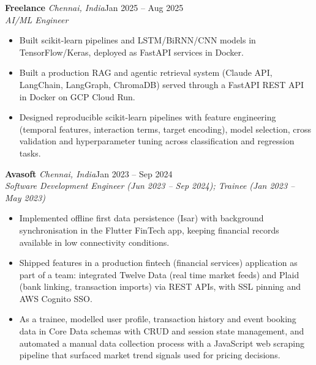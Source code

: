 \documentclass[a4paper,11pt]{article}
\newcommand{\role}[4]{%
  \textbf{#1}{\color{muted}\,\textperiodcentered\,\textit{#2}}\hfill{\color{muted}#3}\\
  \textit{#4}\par}
\newcommand{\gap}{\vspace{5pt}}
\begin{document}
\gap
{}
\role{Freelance}{Chennai, India}{Jan 2025 – Aug 2025}{AI/ML Engineer}
\begin{itemize}
  \item Built scikit-learn pipelines and LSTM/BiRNN/CNN models in TensorFlow/Keras, deployed as FastAPI services in Docker.
  \item Built a production RAG and agentic retrieval system (Claude API, LangChain, LangGraph, ChromaDB) served through a FastAPI REST API in Docker on GCP Cloud Run.
  \item Designed reproducible scikit-learn pipelines with feature engineering (temporal features, interaction terms, target encoding), model selection, cross validation and hyperparameter tuning across classification and regression tasks.
\end{itemize}
\gap
{}
\role{Avasoft}{Chennai, India}{Jan 2023 – Sep 2024}{Software Development Engineer (Jun 2023 – Sep 2024); Trainee (Jan 2023 – May 2023)}
\begin{itemize}
  \item Implemented offline first data persistence (Isar) with background synchronisation in the Flutter FinTech app, keeping financial records available in low connectivity conditions.
  \item Shipped features in a production fintech (financial services) application as part of a team: integrated Twelve Data (real time market feeds) and Plaid (bank linking, transaction imports) via REST APIs, with SSL pinning and AWS Cognito SSO.
  \item As a trainee, modelled user profile, transaction history and event booking data in Core Data schemas with CRUD and session state management, and automated a manual data collection process with a JavaScript web scraping pipeline that surfaced market trend signals used for pricing decisions.
\end{itemize}
\end{document}
